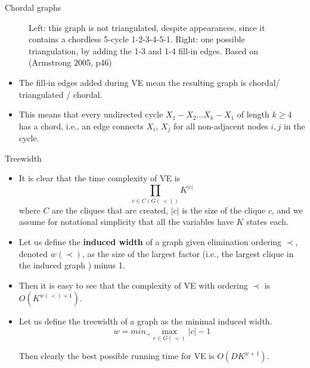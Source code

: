 \documentclass[10pt,mathserif]{beamer}
\begin{document}
\begin{frame}{Chordal graphs}
\begin{figure}[h]
\centering     %
{}

\caption{Left: this graph is not triangulated, despite appearances, since it contains a chordless 5-cycle 1-2-3-4-5-1. Right: one possible triangulation, by adding the 1-3 and 1-4 fill-in edges. Based on (Armstrong 2005, p46)}
\end{figure}

\begin{itemize}
\item The fill-in edges added during VE mean the resulting graph is chordal/ triangulated / chordal.
\item This means that every undirected cycle $X_1 - X_2 ... X_k - X_1$ of length $k \geq 4$ has a chord, i.e., an edge connects $X_i$, $X_j$ for all non-adjacent nodes $i,j$ in the cycle.
\end{itemize}        
\end{frame}

\begin{frame}{Treewidth}
\begin{itemize}
    \item It is clear that the time complexity of VE is
    \begin{equation}
        \prod_{c\in C(G(\prec))}K^{|c|} 
    \end{equation}
    where $C$ are the cliques that are created, $|c|$ is the size of the clique $c$, and we assume for notational simplicity that all the variables have $K$ states each.
    
    \item Let us define the \textbf{induced width} of a graph given elimination ordering $\prec$, denoted $w(\prec)$, as the size of the largest factor (i.e., the largest clique in the induced graph ) minus 1.
    
    \item Then it is easy to see that the complexity of VE with ordering $\prec$ is $O(K^{w(\prec)+1})$.
    
    \item Let us define the treewidth of a graph as the minimal induced width.
    \begin{equation}
        w = min_\prec \max_{c\in G(\prec)} |c|-1
    \end{equation}
    
    Then clearly the best possible running time for VE is $O(DK^{w+1})$.
\end{itemize}
\end{frame}
\end{document}
